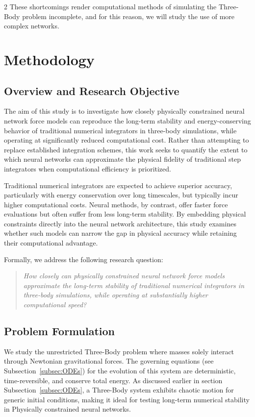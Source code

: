 \documentclass{article}
\begin{document}
\begin{multicols}{2}
These shortcomings render computational methods of simulating the Three-Body problem incomplete, and for this reason, we will study the use of more complex networks.

\section{Methodology}

\subsection{Overview and Research Objective}
\label{research_obj}
The aim of this study is to investigate how closely physically constrained neural network force models can reproduce the long-term stability and energy-conserving behavior of traditional numerical integrators in three-body simulations, while operating at significantly reduced computational cost. Rather than attempting to replace established integration schemes, this work seeks to quantify the extent to which neural networks can approximate the physical fidelity of traditional step integrators when computational efficiency is prioritized.

Traditional numerical integrators are expected to achieve superior accuracy, particularly with  energy conservation over long timescales, but typically incur higher computational costs. Neural methods, by contrast, offer faster force evaluations but often suffer from less long-term stability. By embedding physical constraints directly into the neural network architecture, this study examines whether such models can narrow the gap in physical accuracy while retaining their computational advantage.

Formally, we address the following research question:
\begin{quote}
\emph{How closely can physically constrained neural network force models approximate the long-term stability of traditional numerical integrators in three-body simulations, while operating at substantially higher computational speed?}
\end{quote}

\subsection{Problem Formulation}
We study the unrestricted Three-Body problem where masses solely interact through Newtonian gravitational forces. The governing equations (see Subsection~\ref{subsec:ODEs}) for the evolution of this system are deterministic, time-reversible, and conserve total energy. As discussed earlier in section Subsection~\ref{subsec:ODEs}, a Three-Body system exhibits chaotic motion for generic initial conditions, making it ideal for testing long-term numerical stability in Physically constrained neural networks.


\end{multicols}
\end{document}
